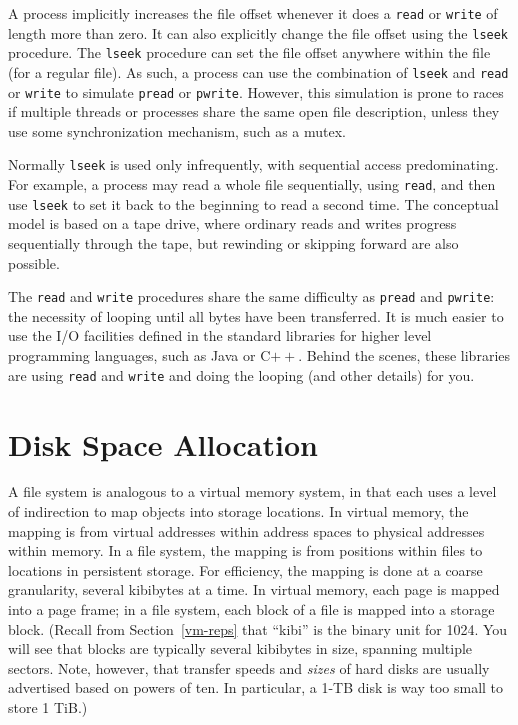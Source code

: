 A process implicitly increases the file offset whenever it does a
\verb|read| or \verb|write| of length more than zero.  It can also
explicitly change the file offset using the
\verb|lseek| procedure.  The \verb|lseek|
procedure can set the file offset anywhere within the file (for a
regular file).  As such, a process can use the combination of
\verb|lseek| and \verb|read| or
\verb|write| to simulate \verb|pread| or \verb|pwrite|.  However,
this simulation is prone to races if multiple threads or processes
share the same open file description, unless they use some synchronization
mechanism, such as a mutex.

Normally \verb|lseek| is used only infrequently, with sequential
access predominating.  For example, a process may read a whole file
sequentially, using \verb|read|, and then use \verb|lseek| to set it
back to the beginning to read a second time.  The conceptual model is
based on a tape drive, where ordinary reads and writes progress
sequentially through the tape, but rewinding or skipping forward are
also possible.

The \verb|read| and \verb|write| procedures share the same difficulty
as \verb|pread| and \verb|pwrite|:
the necessity of looping until all bytes have been
transferred.  It is much easier to use the I/O facilities
defined in the standard libraries for higher level programming
languages, such as Java or C$++$.  Behind the scenes, these
libraries are using \verb|read| and \verb|write| and doing the
looping (and other details) for you.


\section{Disk Space Allocation}\label{disk-allocation-section}

A file system is analogous to a virtual
memory system, in that each uses a level of indirection to map objects
into storage locations.  In virtual memory, the mapping is from
virtual addresses within address spaces to physical addresses within
memory.  In a file system, the mapping is from positions within files
to locations in persistent storage.  For efficiency, the mapping is done at a coarse
granularity, several kibibytes at a time.  In virtual memory, each
page is mapped into a page frame; in a file system, each block of a
file is mapped into a storage block.  (Recall from Section~\ref{vm-reps}
that ``kibi'' is the binary unit for 1024.  You will see that blocks are
typically several kibibytes in size, spanning multiple sectors.
Note, however, that transfer speeds and \emph{sizes} of hard disks are
usually advertised based on powers of ten.  In particular, a 1-TB disk is
way too small to store 1 TiB.)

